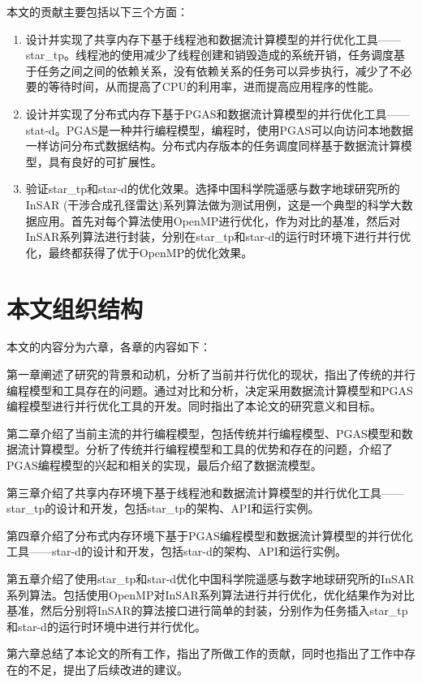 本文的贡献主要包括以下三个方面：

\begin{enumerate}
	\item 设计并实现了共享内存下基于线程池和数据流计算模型的并行优化工具——star\_tp。线程池的使用减少了线程创建和销毁造成的系统开销，任务调度基于任务之间之间的依赖关系，没有依赖关系的任务可以异步执行，减少了不必要的等待时间，从而提高了CPU的利用率，进而提高应用程序的性能。
	\item 设计并实现了分布式内存下基于PGAS和数据流计算模型的并行优化工具——stat-d。PGAS是一种并行编程模型，编程时，使用PGAS可以向访问本地数据一样访问分布式数据结构。分布式内存版本的任务调度同样基于数据流计算模型，具有良好的可扩展性。
	\item 验证star\_tp和star-d的优化效果。选择中国科学院遥感与数字地球研究所的InSAR (干涉合成孔径雷达)系列算法做为测试用例，这是一个典型的科学大数据应用。首先对每个算法使用OpenMP进行优化，作为对比的基准，然后对InSAR系列算法进行封装，分别在star\_tp和star-d的运行时环境下进行并行优化，最终都获得了优于OpenMP的优化效果。
\end{enumerate}

\section{本文组织结构}

本文的内容分为六章，各章的内容如下：

第一章阐述了研究的背景和动机，分析了当前并行优化的现状，指出了传统的并行编程模型和工具存在的问题。通过对比和分析，决定采用数据流计算模型和PGAS编程模型进行并行优化工具的开发。同时指出了本论文的研究意义和目标。

第二章介绍了当前主流的并行编程模型，包括传统并行编程模型、PGAS模型和数据流计算模型。分析了传统并行编程模型和工具的优势和存在的问题，介绍了PGAS编程模型的兴起和相关的实现，最后介绍了数据流模型。

第三章介绍了共享内存环境下基于线程池和数据流计算模型的并行优化工具——star\_tp的设计和开发，包括star\_tp的架构、API和运行实例。

第四章介绍了分布式内存环境下基于PGAS编程模型和数据流计算模型的并行优化工具——star-d的设计和开发，包括star-d的架构、API和运行实例。

第五章介绍了使用star\_tp和star-d优化中国科学院遥感与数字地球研究所的InSAR系列算法。包括使用OpenMP对InSAR系列算法进行并行优化，优化结果作为对比基准，然后分别将InSAR的算法接口进行简单的封装，分别作为任务插入star\_tp和star-d的运行时环境中进行并行优化。

第六章总结了本论文的所有工作，指出了所做工作的贡献，同时也指出了工作中存在的不足，提出了后续改进的建议。
